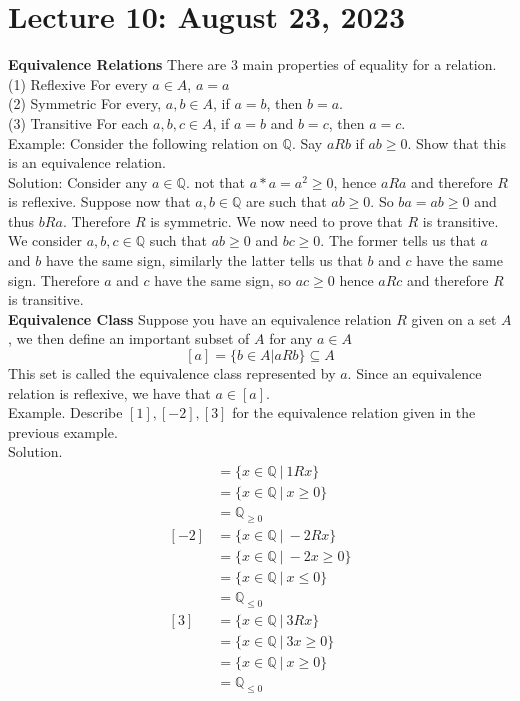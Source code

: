 \documentclass{article}
\begin{document}
\section{Lecture 10: August 23, 2023}
\textbf{Equivalence Relations} There are 3 main properties of equality for a relation.\\
(1) Reflexive For every \(a \in A\), \(a = a\)\\
(2) Symmetric For every, \(a,b \in A\), if \(a = b\), then \(b = a\).\\
(3) Transitive For each \(a,b,c \in A\), if \(a = b\) and \(b = c\), then \(a = c\).\\
Example: Consider the following relation on \(\mathbb{Q}\). Say \(aRb\) if \(ab \geq 0\). Show that this is an equivalence relation.\\
Solution: Consider any \(a \in \mathbb{Q}\). not that \(a * a = a^2 \geq 0\), hence \(aRa\) and therefore \(R\) is reflexive. Suppose now that \(a,b \in \mathbb{Q}\) are such that \(ab \geq 0\). So \(ba = ab \geq 0\) and thus \(bRa\). Therefore \(R\) is symmetric. We now need to prove that \(R\) is transitive. We consider \(a,b,c \in \mathbb{Q}\) such that \(ab \geq 0\) and \(bc \geq 0\). The former tells us that \(a\) and \(b\) have the same sign, similarly the latter tells us that \(b\) and \(c\) have the same sign. Therefore \(a\) and \(c\) have the same sign, so \(ac \geq 0\) hence \(aRc\) and therefore \(R\) is transitive.\\
\textbf{Equivalence Class} Suppose you have an equivalence relation \(R\) given on a set \(A\), we then define an important subset of \(A\) for any \(a \in A\)
\[[a] = \{b \in A \vert aRb\} \subseteq A\]
This set is called the equivalence class represented by \(a\). Since an equivalence relation is reflexive, we have that \(a \in [a]\).\\
Example. Describe \([1],[-2],[3]\) for the equivalence relation given in the previous example.\\
Solution.
\begin{align*} [1] &= \{x \in \mathbb{Q}\ \vert\ 1Rx\}\\[0.5em]  &= \{x \in \mathbb{Q}\ \vert\ x \geq 0\}\\[0.5em]  &= \mathbb{Q}_{\geq 0}\\[1em] [-2] &= \{x \in \mathbb{Q}\ \vert\ -2Rx\}\\[0.5em]  &= \{x \in \mathbb{Q}\ \vert\ -2x \geq 0\}\\[0.5em]  &= \{x \in \mathbb{Q}\ \vert\ x \leq 0\}\\[0.5em]  &= \mathbb{Q}_{\leq 0}\\[1em] [3] &= \{x \in \mathbb{Q}\ \vert\ 3Rx\}\\[0.5em]  &= \{x \in \mathbb{Q}\ \vert\ 3x \geq 0\}\\[0.5em]  &= \{x \in \mathbb{Q}\ \vert\ x \geq 0\}\\[0.5em]  &= \mathbb{Q}_{\leq 0} \end{align*}
\end{document}
